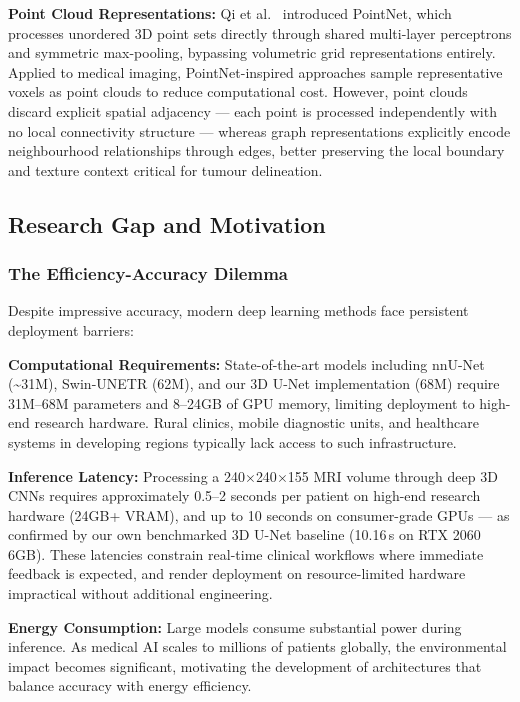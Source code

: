 \documentclass{article}
\begin{document}
\textbf{Point Cloud Representations:} Qi et al.\ \cite{qi2017pointnet} introduced PointNet, which processes unordered 3D point sets directly through shared multi-layer perceptrons and symmetric max-pooling, bypassing volumetric grid representations entirely. Applied to medical imaging, PointNet-inspired approaches sample representative voxels as point clouds to reduce computational cost. However, point clouds discard explicit spatial adjacency — each point is processed independently with no local connectivity structure — whereas graph representations explicitly encode neighbourhood relationships through edges, better preserving the local boundary and texture context critical for tumour delineation.

\subsection{Research Gap and Motivation}

\subsubsection{The Efficiency-Accuracy Dilemma}

Despite impressive accuracy, modern deep learning methods face persistent deployment barriers:

\textbf{Computational Requirements:} State-of-the-art models including nnU-Net (\textasciitilde31M), Swin-UNETR (62M), and our 3D U-Net implementation (68M) require 31M--68M parameters and 8--24GB of GPU memory, limiting deployment to high-end research hardware. Rural clinics, mobile diagnostic units, and healthcare systems in developing regions typically lack access to such infrastructure.

\textbf{Inference Latency:} Processing a 240$\times$240$\times$155 MRI volume through deep 3D CNNs requires approximately 0.5--2 seconds per patient on high-end research hardware (24GB+ VRAM), and up to 10 seconds on consumer-grade GPUs — as confirmed by our own benchmarked 3D U-Net baseline (10.16\,s on RTX 2060 6GB). These latencies constrain real-time clinical workflows where immediate feedback is expected, and render deployment on resource-limited hardware impractical without additional engineering.

\textbf{Energy Consumption:} Large models consume substantial power during inference. As medical AI scales to millions of patients globally, the environmental impact becomes significant, motivating the development of architectures that balance accuracy with energy efficiency.
\end{document}
